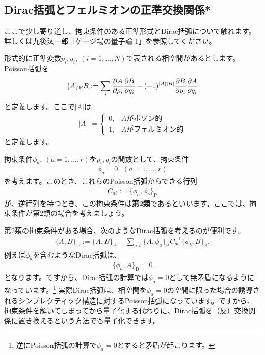 \documentclass[report,paper=a4, fontsize=12pt, line_length=16cm, number_of_lines=34,dvipdfmx]{jlreq}
\numberwithin{equation}{chapter}
\numberwithin{equation}{section}
\newcommand{\kyou}[1]{{\sffamily \bfseries #1}}
\newcommand{\pbk}[1]{\{#1\}_{\mathrm{P}}}
\newcommand{\dbk}[1]{\{#1\}_{\mathrm{D}}}
\begin{document}
\subsection{Dirac括弧とフェルミオンの正準交換関係*}
ここで少し寄り道し、拘束条件のある正準形式とDirac括弧について触れます。詳しくは九後汰一郎「ゲージ場の量子論 1」を参照してください。

形式的に正準変数$p_i,q_i,\ (i=1,\dots,N)$で表される相空間があるとします。Poisson括弧を
\begin{align}
  \pbk{A}{B}:=\sum_{i}\pdv{A}{p_i}\pdv{B}{q_i}-(-1)^{|A||B|}\pdv{B}{p_i}\pdv{A}{q_i}
\end{align}
と定義します。ここで$|A|$は
\begin{align}
  |A|:=\begin{cases}
    0,&A\text{がボゾン的}\\
    1,&A\text{がフェルミオン的}
  \end{cases}
\end{align}
と定義します。

拘束条件$\phi_{a},\ (a=1,\dots,r)$を$p_i,q_i$の関数として、拘束条件
\begin{align}
  \phi_{a}=0,\ (a=1,\dots,r)
\end{align}
を考えます。このとき、これらのPoisson括弧からできる行列
\begin{align}
  C_{ab}:=\pbk{\phi_a,\phi_b}
\end{align}
が、逆行列を持つとき、この拘束条件は\kyou{第2類}であるといいます。ここでは、拘束条件が第2類の場合を考えましょう。

第2類の拘束条件がある場合、次のようなDirac括弧を考えるのが便利です。
\begin{align}
  \dbk{A,B}:=\pbk{A,B}-\sum_{a,b} \pbk{A,\phi_a} C^{-1}_{ab} \pbk{\phi_b,B}.
\end{align}
例えば$\phi_a$を含むようなDirac括弧は、
\begin{align}
  \dbk{\phi_a,A}=0
\end{align}
となります。ですから、Dirac括弧の計算では$\phi_a=0$として無矛盾になるようになっています。\footnote{逆にPoisson括弧の計算で$\phi_a=0$とすると矛盾が起こります。}
実際Dirac括弧は、相空間を$\phi_a=0$の空間に限った場合の誘導されるシンプレクティック構造に対するPoisson括弧になっています。ですから、拘束条件を解いてしまってから量子化する代わりに、Dirac括弧を（反）交換関係に置き換えるという方法でも量子化できます。
\end{document}
